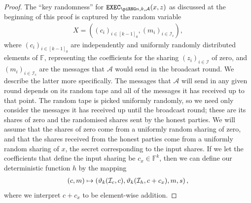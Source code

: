 \documentclass{article}
\newcommand{\seqZ}[1]{\left[#1\right]_0}
\theoremstyle{remark}
\newcommand{\F}{\mathbb{F}}
\begin{document}
\begin{proof}
	The ``key randomness'' for $\execD$ as discussed at the beginning of this
	proof is captured by the random variable
	\begin{align*}
		X
		=
		\left(
			{(c_i)}_{i \in \seqZ{k-1}},
			{(m_i)}_{i \in \mathcal{I}_c}
		\right),
	\end{align*}
	where ${(c_i)}_{i \in \seqZ{k-1}}$ are independently and uniformly randomly
	distributed elements of $\F$, representing the coefficients for the sharing
	${(z_i)}_{i \in \mathcal{I}}$ of zero, and ${(m_i)}_{i \in \mathcal{I}_c}$
	are the messages that $\mathcal{A}$ would send in the broadcast round. We
	describe the latter more specifically. The messages that $\mathcal{A}$ will
	send in any given round depends on its random tape and all of the messages
	it has received up to that point. The random tape is picked uniformly
	randomly, so we need only consider the messages it has received up until
	the broadcast round; these are its shares of zero and the randomised shares
	sent by the honest parties. We will assume that the shares of zero come
	from a uniformly random sharing of zero, and that the shares received from
	the honest parties come from a uniformly random sharing of $x$, the secret
	corresponding to the input shares. If we let the coefficients that define
	the input sharing be $c_x \in \F^k$, then we can define our deterministic
	function $h$ by the mapping
	\begin{align*}
		(c, m)
		\mapsto
		\left(
			\vartheta_{k}(\mathcal{I}_c, c),
			\vartheta_{k}(\mathcal{I}_h, c + c_x),
			m,
			s
		\right),
	\end{align*}
	where we interpret $c + c_x$ to be element-wise addition.


\end{proof}
\end{document}
